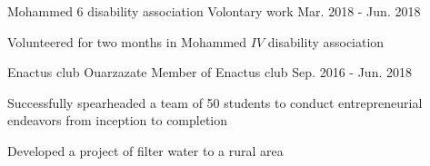 

\begin{cventries}

  \cventry
    {Mohammed 6 disability association} %
    {Volontary work} %
       {} %
    {Mar. 2018 - Jun. 2018} %
    {
      \begin{cvitems} %
        \item {Volunteered for two months in Mohammed $IV$ disability association}
      \end{cvitems}
    }

 

 
 
  \cventry
    {Enactus club Ouarzazate} %
  {Member of Enactus club} %
       {} %
    {Sep. 2016 - Jun. 2018} %
    {
      \begin{cvitems} %
        \item {Successfully spearheaded a team of 50 students to conduct entrepreneurial endeavors from inception to completion}
        \item {Developed a project of filter water to a rural area}
      \end{cvitems}
    }

\end{cventries}
